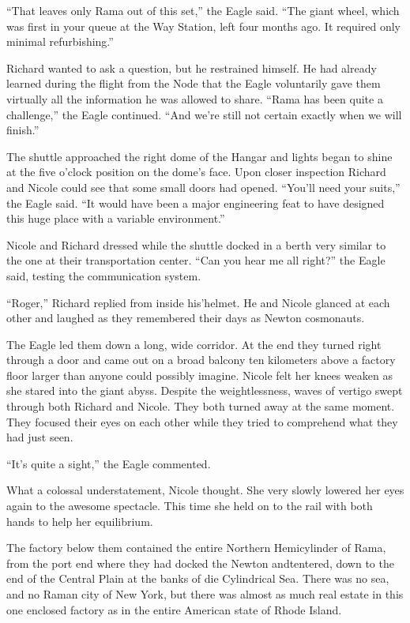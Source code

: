 \documentclass[]{article}
\begin{document}
{“That leaves only Rama out of this set,” the Eagle said.  “The giant wheel, which was first in your queue at the Way Station, left four months ago.  It required only minimal refurbishing.”

Richard wanted to ask a question, but he restrained himself.  He had already learned during the flight from the Node that the Eagle voluntarily gave them virtually all the information he was allowed to share.  “Rama has been quite a challenge,” the Eagle continued.  “And we’re still not certain exactly when we will finish.”

The shuttle approached the right dome of the Hangar and lights began to shine at the five o’clock position on the dome’s face.  Upon closer inspection Richard and Nicole could see that some small doors had opened.  “You’ll need your suits,” the Eagle said.  “It would have been a major engineering feat to have designed this huge place with a variable environment.”

Nicole and Richard dressed while the shuttle docked in a berth very similar to the one at their transportation center.  “Can you hear me all right?” the Eagle said, testing the communication system.

“Roger,” Richard replied from inside his’helmet.  He and Nicole glanced at each other and laughed as they remembered their days as Newton cosmonauts.

The Eagle led them down a long, wide corridor.  At the end they turned right through a door and came out on a broad balcony ten kilometers above a factory floor larger than anyone could possibly imagine.  Nicole felt her knees weaken as she stared into the giant abyss.  Despite the weightlessness, waves of vertigo swept through both Richard and Nicole.  They both turned away at the same moment.  They focused their eyes on each other while they tried to comprehend what they had just seen.

“It’s quite a sight,” the Eagle commented.

What a colossal understatement, Nicole thought.  She very slowly lowered her eyes again to the awesome spectacle.  This time she held on to the rail with both hands to help her equilibrium.

The factory below them contained the entire Northern Hemicylinder of Rama, from the port end where they had docked the Newton andtentered, down to the end of the Central Plain at the banks of die Cylindrical Sea.  There was no sea, and no Raman city of New York, but there was almost as much real estate in this one enclosed factory as in the entire American state of Rhode Island.

}
\end{document}
